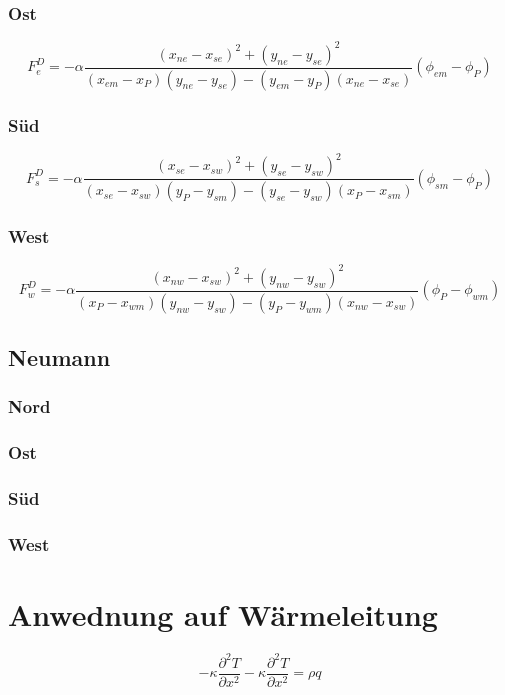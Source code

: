 \documentclass[10pt,a4paper]{article}
\begin{document}
\subsubsection{Ost}
\begin{equation}
F_e^D = -\alpha \frac{(x_{ne}-x_{se})^2+(y_{ne}-y_{se})^2}{(x_{em}-x_P)(y_{ne}-y_{se})-(y_{em}-y_P)(x_{ne}-x_{se})}(\phi_{em}-\phi_P)
\end{equation}
\subsubsection{Süd}
\begin{equation}
F_s^D = -\alpha \frac{(x_{se}-x_{sw})^2+(y_{se}-y_{sw})^2}{(x_{se}-x_{sw})(y_P-y_{sm})-(y_{se}-y_{sw})(x_P-x_{sm})}(\phi_{sm}-\phi_P)
\end{equation}
\subsubsection{West}
\begin{equation}
F_w^D = -\alpha \frac{(x_{nw}-x_{sw})^2+(y_{nw}-y_{sw})^2}{(x_P-x_{wm})(y_{nw}-y_{sw})-(y_P-y_{wm})(x_{nw}-x_{sw})}(\phi_P-\phi_{wm})
\end{equation}
\subsection{Neumann}
\subsubsection{Nord}
\subsubsection{Ost}
\subsubsection{Süd}
\subsubsection{West}



\section{Anwednung auf Wärmeleitung}

\begin{equation}
-\kappa \frac{\partial^2 T}{\partial x^2} -\kappa \frac{\partial^2 T}{\partial x^2} = \rho q 
\end{equation}
\end{document}
